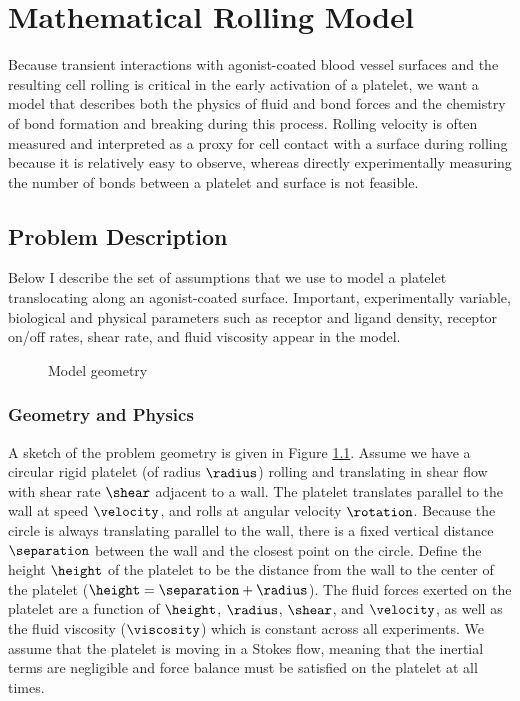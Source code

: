 
\chapter{Mathematical Rolling Model}

Because transient interactions with agonist-coated blood vessel
surfaces and the resulting cell rolling is critical in the early
activation of a platelet, we want a model that describes both the
physics of fluid and bond forces and the chemistry of bond formation
and breaking during this process. Rolling velocity is often measured
and interpreted as a proxy for cell contact with a surface during
rolling because it is relatively easy to observe, whereas directly
experimentally measuring the number of bonds between a platelet and
surface is not feasible. 

\section{Problem Description}
\label{sec:problem-description}

Below I describe the set of assumptions that we use to model a
platelet translocating along an agonist-coated surface. Important,
experimentally variable, biological and physical parameters such as
receptor and ligand density, receptor on/off rates, shear rate, and
fluid viscosity appear in the model.

\begin{figure}
  \centering
  
  \caption{Model geometry}
  \label{fig:model-geometry}
\end{figure}

\subsection{Geometry and Physics}
\label{sec:geometry-physics}

A sketch of the problem geometry is given in Figure
\ref{fig:model-geometry}. Assume we have a circular rigid platelet (of
radius $\radius$) rolling and translating in shear flow with shear
rate $\shear$ adjacent to a wall. The platelet translates parallel to
the wall at speed $\velocity$, and rolls at angular velocity
$\rotation$. Because the circle is always translating parallel to the
wall, there is a fixed vertical distance $\separation$ between the
wall and the closest point on the circle. Define the height $\height$
of the platelet to be the distance from the wall to the center of the
platelet ($\height = \separation + \radius$). The fluid forces exerted
on the platelet are a function of $\height$, $\radius$, $\shear$, and
$\velocity$, as well as the fluid viscosity ($\viscosity$) which is
constant across all experiments. We assume that the platelet is moving
in a Stokes flow, meaning that the inertial terms are negligible and
force balance must be satisfied on the platelet at all times.

